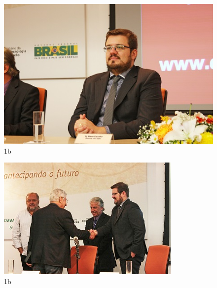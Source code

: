 \begin{figure}[h!]
  \centering
  \includegraphics[width=1\linewidth]{Fotos/Solenidade/6.jpg}
  \caption{1b}
  \label{nov20135}
\end{figure}

\begin{figure}[h!]
  \centering
  \includegraphics[width=1\linewidth]{Fotos/Solenidade/7.jpg}
  \caption{1b}
  \label{nov20136}
\end{figure}